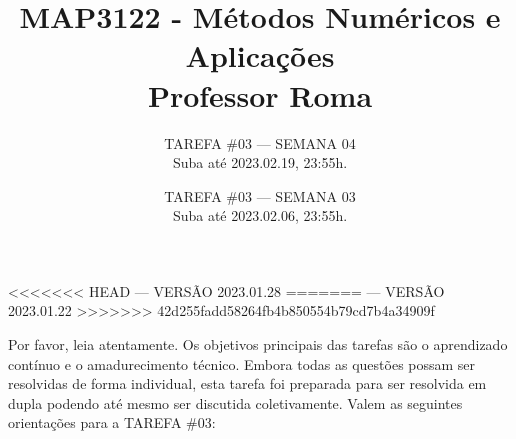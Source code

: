 \documentclass{article}
\title{MAP3122 - Métodos Numéricos e Aplicações\\ Professor Roma\\ }
\author{TAREFA \#03 --- SEMANA 04\\ Suba até 2023.02.19, 23:55h.}
\author{TAREFA \#03 --- SEMANA 03\\ Suba até 2023.02.06, 23:55h.}
\date{}
\begin{document}
\maketitle


    \vspace{-3mm}
    
<<<<<<< HEAD
    \mbox{}\hfill  --- VERSÃO 2023.01.28
=======
    \mbox{}\hfill  --- VERSÃO 2023.01.22
>>>>>>> 42d255fadd58264fb4b850554b79cd7b4a34909f

\vspace{3mm}

Por favor, leia atentamente. Os objetivos principais das tarefas são o aprendizado contínuo e o amadurecimento técnico.
Embora todas as questões  possam ser resolvidas de forma individual, esta tarefa foi preparada para ser resolvida em dupla podendo até mesmo ser discutida coletivamente. Valem as seguintes orientações para a TAREFA \#03:
\end{document}
